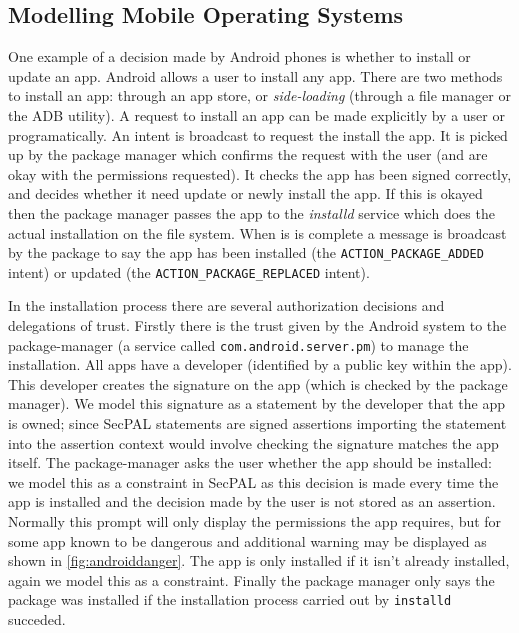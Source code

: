 \documentclass[a4paper,sfsidenotes]{%
  article%
}
\begin{document}
\subsection{Modelling Mobile Operating Systems}
\label{sec:modellingmobileos}

One example of a decision made by Android phones is whether to install or update
an app.  Android allows a user to install any app.  There are two methods to
install an app: through an app store, or \emph{side-loading} (through a file
manager or the \ac{ADB} utility).  A request to install an app can be made
explicitly by a user or programatically.  An intent is broadcast to request the
install the app.  It is picked up by the package manager which confirms the
request with the user (and are okay with the permissions requested). It checks the
app has been signed correctly, and decides whether it need update or newly install
the app.  If this is okayed then the package manager passes the app to the
\emph{installd} service which does the actual installation on the file system.
When is is complete a message is broadcast by the package to say the app has
been installed (the \texttt{ACTION\_PACKAGE\_ADDED} intent) or updated (the
\texttt{ACTION\_PACKAGE\_REPLACED} intent).

In the installation process there are several authorization decisions and
delegations of trust.  Firstly there is the trust given by the Android system to
the package-manager (a service called \texttt{com.android.server.pm}) to manage
the installation.  All apps have a developer (identified by a public key within
the app).  This developer creates the signature on the app (which is checked by
the package manager).  We model this signature as a statement by the developer
that the app is owned; since SecPAL statements are signed assertions importing
the statement into the assertion context would involve checking the signature
matches the app itself.  The package-manager asks the user whether the app
should be installed: we model this as a constraint in SecPAL as this decision is
made every time the app is installed and the decision made by the user is not
stored as an assertion. Normally this prompt will only display the permissions
the app requires, but for some app known to be dangerous and additional warning
may be displayed as shown in \autoref{fig:androiddanger}. The app is only installed if it isn't already
installed, again we model this as a constraint.  Finally the package manager
only says the package was installed if the installation process carried out by
\texttt{installd} succeded. 
\end{document}
